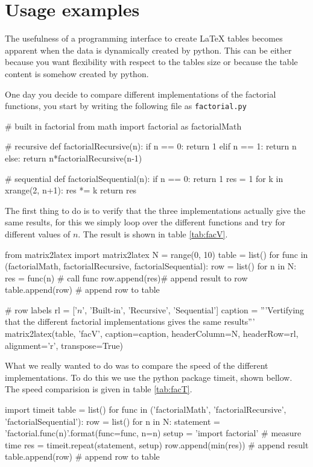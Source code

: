 {{\section{Usage examples}
The usefulness of a programming interface to create \LaTeX{}
tables becomes apparent when the data is dynamically created by python.
This can be either because you want flexibility with respect to the tables size
or because the table content is somehow created by python.

One day you decide to compare different implementations of the
factorial functions, you start by writing the following file
as \verb!factorial.py!
\begin{pyblock}[factorial]
# built in factorial
from math import factorial as factorialMath

# recursive
def factorialRecursive(n):
    if n == 0:
        return 1
    elif n == 1:
        return n
    else:
        return n*factorialRecursive(n-1)

# sequential
def factorialSequential(n):
    if n == 0:
        return 1
    res = 1
    for k in xrange(2, n+1):
        res *= k
    return res  
\end{pyblock}

The first thing to do is to verify that the three implementations actually give
the same results, for this we simply loop over the different functions and try for
different values of $n$. The result is shown in table \ref{tab:facV}.
\begin{pyblock}[factorial]
from matrix2latex import matrix2latex
N = range(0, 10)
table = list()
for func in (factorialMath,
             factorialRecursive,
             factorialSequential):
    row = list()
    for n in N:
        res = func(n)  # call func
        row.append(res)# append result to row
    table.append(row)  # append row to table

# row labels
rl = ['$n$', 'Built-in', 'Recursive', 'Sequential']
caption = '''Vertifying that the different factorial
implementations gives the same results'''
matrix2latex(table, 'facV', caption=caption,
             headerColumn=N, headerRow=rl,
             alignment='r', transpose=True)  
\end{pyblock}


What we really wanted to do was to
compare the speed of the different implementations. To do this
we use the python package timeit, shown bellow. The speed comparision is given in table \ref{tab:facT}.
\begin{pyblock}[factorial]
import timeit
table = list()
for func in ('factorialMath',
             'factorialRecursive',
             'factorialSequential'):
    row = list()
    for n in N:
        statement = 'factorial.{func}({n})'.format(func=func,
                                                   n=n)
        setup = 'import factorial'
        # measure time
        res = timeit.repeat(statement, setup)
        row.append(min(res)) # append result
    table.append(row) # append row to table


\end{pyblock}}}
